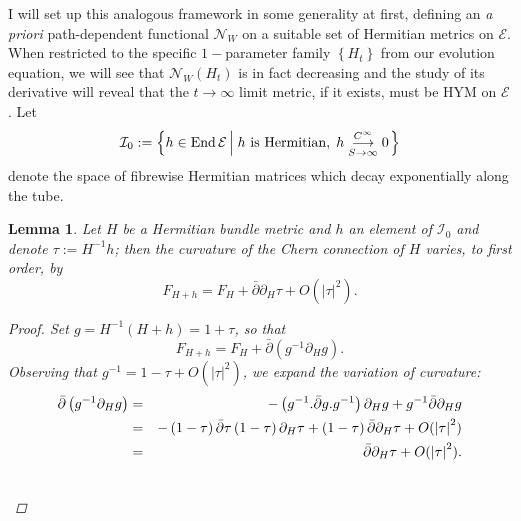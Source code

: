 \documentclass{article}
\newcommand{\func}[1]{\textnormal {#1\,}}
\newcommand{\tublim}{\overset{C^\infty}{\underset{S\rightarrow\infty}{\longrightarrow}}}
\newtheorem{lemma}[theorem]{Lemma}
\begin{document}
I will set up this analogous framework in some generality at first, defining an \emph{a priori} path-dependent functional $\mathcal{N}_{W}$ on a
suitable set of Hermitian metrics on $\mathcal{E}$. When restricted to
the specific $1-$parameter family $\left\{ H_{t}\right\} $ from our
evolution equation, we will see that $\mathcal{N}_{W}\left( H_{t}\right)$
is in fact decreasing and the study of its derivative will reveal that the $t\rightarrow \infty $
limit metric, if it exists, must be HYM on $\mathcal{E}$. Let 
\begin{displaymath}
        \mathcal{I}_0 := \left\{ h\in\func{End}\mathcal{E}  \left\vert\; h\text{ is Hermitian}, \; h \tublim 0\right. \right\}
\end{displaymath}
 denote the space of fibrewise Hermitian matrices
which decay exponentially along the tube.
\begin{lemma}   \label{Lemma 1st order var of curvature}
Let $H$ be a Hermitian bundle
metric and  $h$ an element of $\mathcal{I}_0$ and denote $%
\tau := H^{-1}h$; then the curvature of the
Chern connection of $H$ varies, to first order, by%
\begin{equation*}
        F_{H+h}=F_{H}
        +\bar{\partial}\partial _{H}\tau 
        +O( \left\vert\tau\right\vert ^{2}).
\end{equation*}

\begin{proof}
Set $g=H^{-1}\left( H+h\right) =1+\tau $, so that \cite[p.46]{4-manifolds}\cite[p.15]{ASDYM}%
\begin{equation*}
F_{H+h}=F_{H}+\bar{\partial}\left( g^{-1}\partial _{H}g\right) .
\end{equation*}%
Observing that $g^{-1}=1-\tau +O( \left\vert\tau\right\vert ^{2}) $, we expand the
variation of curvature:%
\begin{eqnarray*}
\bar{\partial}\left( g^{-1}\partial _{H}g\right) &=&-\left( g^{-1}.\bar{%
\partial}g.g^{-1}\right) \partial _{H}g+g^{-1}\bar{\partial}\partial _{H}g \\
&=&-\left( 1-\tau \right) \bar{\partial}\tau \left( 1-\tau \right) \partial
_{H}\tau +\left( 1-\tau \right) \bar{\partial}\partial _{H}\tau +O(
\left\vert\tau\right\vert ^{2}) \\
&=&\bar{\partial}\partial _{H}\tau +O( \left\vert\tau\right\vert ^{2}).
\end{eqnarray*}
\vspace{-1.3cm}\[\qedhere\]
\end{proof}
\end{lemma}
\end{document}
